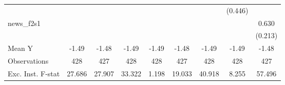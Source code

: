 {\begin{tabular}{l*{8}{c}}
            &                     &                     &                     &                     &                     &                     &     (0.446)         &                     \\
\addlinespace
news\_f2s1   &                     &                     &                     &                     &                     &                     &                     &       0.630\sym{***}\\
            &                     &                     &                     &                     &                     &                     &                     &     (0.213)         \\
\midrule
Mean Y      &       -1.49         &       -1.48         &       -1.49         &       -1.49         &       -1.48         &       -1.49         &       -1.49         &       -1.48         \\
Observations&         428         &         427         &         428         &         428         &         427         &         428         &         428         &         427         \\
Exc. Inst. F-stat&      27.686         &      27.907         &      33.322         &       1.198         &      19.033         &      40.918         &       8.255         &      57.496         \\
\bottomrule
\end{tabular}
}

